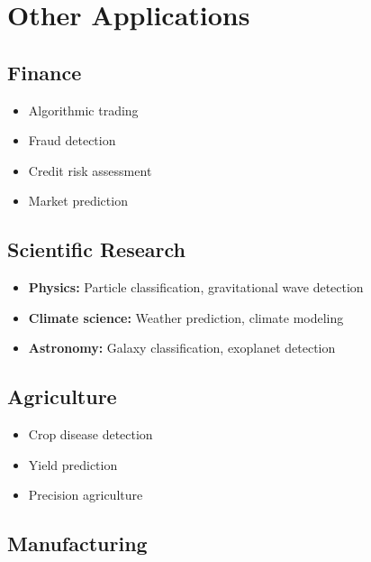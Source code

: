 
\section{Other Applications}
\label{sec:other-applications}

\subsection{Finance}

\begin{itemize}
    \item Algorithmic trading
    \item Fraud detection
    \item Credit risk assessment
    \item Market prediction
\end{itemize}

\subsection{Scientific Research}

\begin{itemize}
    \item \textbf{Physics:} Particle classification, gravitational wave detection
    \item \textbf{Climate science:} Weather prediction, climate modeling
    \item \textbf{Astronomy:} Galaxy classification, exoplanet detection
\end{itemize}

\subsection{Agriculture}

\begin{itemize}
    \item Crop disease detection
    \item Yield prediction
    \item Precision agriculture
\end{itemize}

\subsection{Manufacturing}


